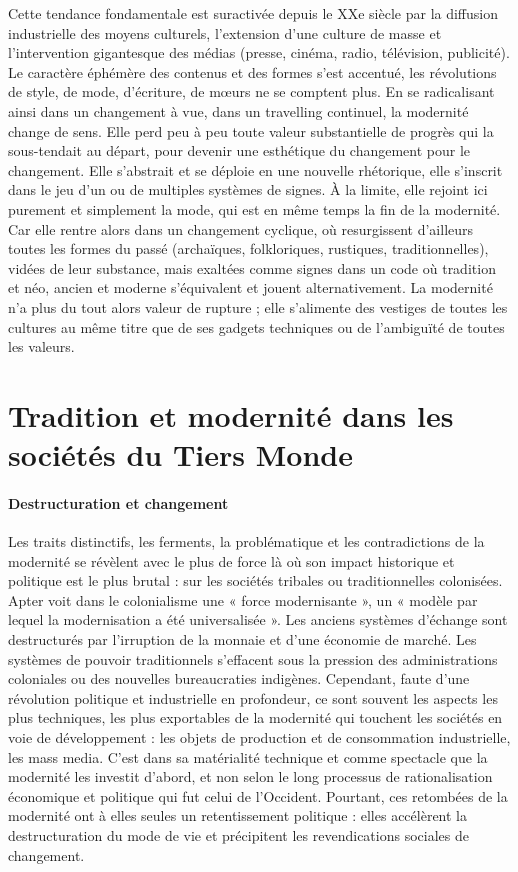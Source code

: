 Cette tendance fondamentale est suractivée depuis le XXe siècle par la diffusion industrielle des moyens culturels, l'extension d'une culture de masse et l'intervention gigantesque des médias (presse, cinéma, radio, télévision, publicité). Le caractère éphémère des contenus et des formes s'est accentué, les révolutions de style, de mode, d'écriture, de mœurs ne se comptent plus. En se radicalisant ainsi dans un changement à vue, dans un travelling continuel, la modernité change de sens. Elle perd peu à peu toute valeur substantielle de progrès qui la sous-tendait au départ, pour devenir une esthétique du changement pour le changement. Elle s'abstrait et se déploie en une nouvelle rhétorique, elle s'inscrit dans le jeu d'un ou de multiples systèmes de signes. À la limite, elle rejoint ici purement et simplement la mode, qui est en même temps la fin de la modernité.
Car elle rentre alors dans un changement cyclique, où resurgissent d'ailleurs toutes les formes du passé (archaïques, folkloriques, rustiques, traditionnelles), vidées de leur substance, mais exaltées comme signes dans un code où tradition et néo, ancien et moderne s'équivalent et jouent alternativement. La modernité n'a plus du tout alors valeur de
rupture ; elle s'alimente des vestiges de toutes les cultures au même titre que de ses gadgets techniques ou de l'ambiguïté de toutes les valeurs.

\section{Tradition et modernité dans les sociétés du Tiers Monde}


\paragraph{Destructuration et changement}
Les traits distinctifs, les ferments, la problématique et les contradictions de la modernité se révèlent avec le plus de force là où son impact historique et politique est le plus brutal : sur les sociétés tribales ou traditionnelles colonisées. Apter voit dans le colonialisme une « force modernisante », un « modèle par lequel la modernisation a été universalisée ».
Les anciens systèmes d'échange sont destructurés par l'irruption de la monnaie et d'une économie de marché. Les systèmes de pouvoir traditionnels s'effacent sous la pression des administrations coloniales ou des nouvelles bureaucraties indigènes.
Cependant, faute d'une révolution politique et industrielle en profondeur, ce sont souvent les aspects les plus techniques, les plus exportables de la modernité qui touchent les sociétés en voie de développement : les objets de production et de consommation industrielle, les mass media. C'est dans sa matérialité technique et comme spectacle que la modernité les investit d'abord, et non selon le long processus de rationalisation économique et politique qui fut celui de l'Occident. Pourtant, ces retombées de la modernité ont à elles seules un retentissement politique : elles accélèrent la destructuration du mode de vie et précipitent les revendications sociales de changement.
